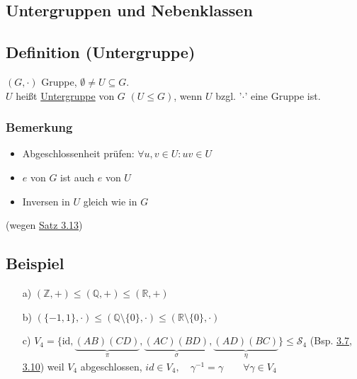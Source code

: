 \documentclass[a4paper, 12pt,titlepage, pdf, headsepline]{scrartcl}
\newcommand{\R}{\mathds{R}}
\newcommand{\uline}[1]{\underline{#1}}
\newcommand{\id}{\textrm{id}}
\renewcommand{\>}{\rightarrow}
\renewcommand{\*}{\cdot}
\begin{document}
	      \subsection*{Untergruppen und Nebenklassen}
	      \subsection{Definition (Untergruppe)}
	      $(G, \cdot)$ Gruppe, $\emptyset \neq U \subseteq G$.\\
	      $U$ heißt \uline{Untergruppe} von $G$ $(U \leq G)$, wenn $U$ bzgl. '$\cdot$' eine Gruppe ist.
	      	
	      \subsubsection*{Bemerkung}
	      \begin{itemize}
	      	\item Abgeschlossenheit prüfen: $\forall u,v  \in U: uv \in U$
	      	\item $e$ von $G$ ist auch $e$ von $U$
	      	\item Inversen in $U$ gleich wie in $G$
	      \end{itemize}
	      (wegen \hyperref[3.13]{Satz 3.13})
	      \subsection{Beispiel}
	      \label{3.16}
	      \begin{itemize}
	      	\item[a)] $(\mathds{Z}, +) \leq (\mathds{Q}, + ) \leq (\R, + )$
	      	\item[b)] $(\{-1,1\}, \cdot) \leq (\mathds{Q}\setminus \{0\}, \cdot) \leq (\R \setminus\{0\}, \cdot)$
	      	\item[c)] $V_4 = \{\id,\underbrace{(AB)(CD)}_{\pi},\underbrace{(AC)(BD)}_{\sigma}, \underbrace{(AD)(BC)}_{\eta}\} \leq \mathscr{S}_4$ (Bsp. \hyperref[3.7]{3.7}, \hyperref[3.10]{3.10}) weil $V_4$ abgeschlossen, $id \in V_4,\quad \gamma^{-1} = \gamma \qquad \forall \gamma \in V_4$
	      \end{itemize}
\end{document}
